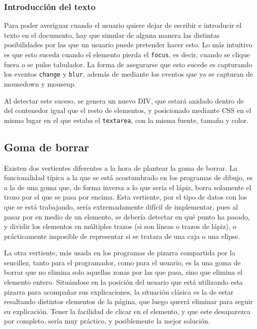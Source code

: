 \subsubsection{Introducción del texto} %
\label{ssub:introduccion_del_texto}
Para poder averiguar cuando el usuario quiere dejar de escribir e introducir el texto en el documento, hay que simular de alguna manera las distintas posibilidades por las que un usuario puede pretender hacer esto. Lo más intuitivo es que esto suceda cuando el elemento pierda el \texttt{focus}, es decir, cuando se clique fuera o se pulse tabulador. La forma de asegurarse que esto sucede es capturando los eventos \texttt{change} y \texttt{blur}, además de mediante los eventos que ya se capturan de mousedown y mouseup.

Al detectar este suceso, se genera un nuevo DIV, que estará anidado dentro de del contenedor igual que el resto de elementos, y posicionado mediante CSS en el mismo lugar en el que estaba el \texttt{textarea}, con la misma fuente, tamaño y color.




\subsection{Goma de borrar} %
\label{sub:goma_de_borrar}

Existen dos vertientes diferentes a la hora de plantear la goma de borrar. La funcionalidad típica a la que se está acostumbrado en los programas de dibujo, es a la de una goma que, de forma inversa a lo que sería el lápiz, borra solamente el trozo por el que se pasa por encima. Esta vertiente, por el tipo de datos con los que se está trabajando, sería extremadamente difícil de implementar, pues al pasar por en medio de un elemento, se debería detectar en qué punto ha pasado, y dividir los elementos en múltiples trazos (si son líneas o trazos de lápiz), o prácticamente imposible de representar si se tratara de una caja o una elipse.

La otra vertiente, más usada en los programas de pizarra compartida por la sencillez, tanto para el programador, como para el usuario, es la una goma de borrar que no elimina solo aquellas zonas por las que pasa, sino que elimina el elemento entero. Situándose en la posición del usuario que está utilizando esta pizarra para acompañar sus explicaciones, la situación clásica es la de estar resaltando distintos elementos de la página, que luego querrá eliminar para seguir su explicación. Tener la facilidad de clicar en el elemento, y que este desaparezca por completo, sería muy práctico, y posiblemente la mejor solución.

